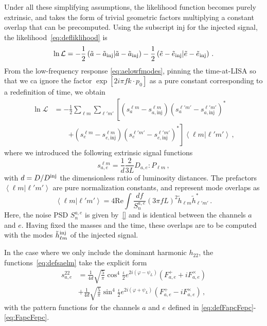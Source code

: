 \documentclass[aps,showpacs,twocolumn,prd,superscriptaddress,nofootinbib]{revtex4-1}
\newcommand{\be}{\begin{equation}}
\newcommand{\ee}{\end{equation}}
\newcommand\calL{{\mathcal{L}}}
\newcommand{\nn}{\nonumber}
\newcommand\psiL{{\psi_{L}}}
\begin{document}
Under all these simplifying assumptions, the likelihood function becomes purely extrinsic, and takes the form of trivial geometric factors multiplying a constant overlap that can be precomputed. Using the subscript $\mathrm{inj}$ for the injected signal, the likelihood~\eqref{eq:defliklihood} is
\be
	\ln \calL = -\frac{1}{2} \left( \tilde{a} - \tilde{a}_{\rm inj} | \tilde{a} - \tilde{a}_{\rm inj} \right) -\frac{1}{2} \left( \tilde{e} - \tilde{e}_{\rm inj} | \tilde{e} - \tilde{e}_{\rm inj} \right) \,.
\ee
From the low-frequency response \eqref{eq:aelowfmodes}, pinning the time-at-LISA so that we ca ignore the factor $\exp [2 i \pi f k\cdot p_{0}]$ as a pure constant corresponding to a redefinition of time, we obtain 
\begin{align}
	\ln \calL &= -\frac{1}{2} \sum_{\ell m} \sum_{\ell' m'}   \left[ \left( s_{a}^{\ell m} - s_{a, \mathrm{inj}}^{\ell m}\right) \left( s_{a}^{\ell' m'} - s_{a, \mathrm{inj}}^{\ell' m'}\right)^{*} \right. \nn\\
	& \qquad \left. + \left( s_{e}^{\ell m} - s_{e, \mathrm{inj}}^{\ell m}\right) \left( s_{e}^{\ell' m'} - s_{e, \mathrm{inj}}^{\ell' m'}\right)^{*} \right] \left\langle \ell m | \ell' m' \right\rangle \,,
\end{align}
where we introduced the following extrinsic signal functions
\be\label{eq:defsaelm}
	s_{a,e}^{\ell m} = \frac{1}{d} \frac{2}{3L} D_{a,e} : P_{\ell m} \,,
\ee
with $d = D / D^{\rm inj}$ the dimensionless ratio of luminosity distances. The prefactors $\left\langle \ell m | \ell' m' \right\rangle$ are pure normalization constants, and represent mode overlaps as
\be
	\left\langle \ell m | \ell' m' \right\rangle = 4\mathrm{Re} \int \frac{df}{S_{n}^{a,e}} \left( 3 \pi f L\right)^{2} \tilde{h}_{\ell m} \tilde{h}_{\ell' m'}^{*} \,.
\ee
Here, the noise PSD $S_{n}^{a,e}$ is given by~\eqref{} and is identical between the channels $a$ and $e$. Having fixed the masses and the time, these overlaps are to be computed with the modes $\tilde{h}_{\ell m}^{\rm inj}$ of the injected signal.

In the case where we only include the dominant harmonic $h_{22}$, the functions~\eqref{eq:defsaelm} take the explicit form
\begin{align}
	s_{a,e}^{22} &= \frac{1}{4d} \sqrt{\frac{5}{\pi}} \cos^{4}\frac{\iota}{2} e^{2i(\varphi-\psiL)} \left( F_{a,e}^{+} + i F_{a,e}^{\times} \right) \\
	&+ \frac{1}{4d} \sqrt{\frac{5}{\pi}} \sin^{4}\frac{\iota}{2} e^{2i(\varphi+\psiL)} \left( F_{a,e}^{+} - i F_{a,e}^{\times} \right) \,,
\end{align}
with the pattern functions for the channels $a$ and $e$ defined in \eqref{eq:defFapcFepc}-\eqref{eq:FapcFepc}.
\end{document}
